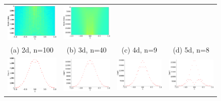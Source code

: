 \documentclass[senior,final,11pt]{iscs-thesis}
\begin{document}
\begin{figure}[htbp]
\begin{tabular}{cccc}
    \includegraphics[width=45mm]{figure/grid_graph_dim[9,9,9,9]txt_pdos.png} &
    \includegraphics[width=45mm]{figure/grid_graph_dim[8,8,8,8,8]txt_pdos.png} \\
    (a) 2d, n=100 & (b) 3d, n=40& (c) 4d, n=9 & (d) 5d, n=8\\ [6pt]
    \includegraphics[width=45mm]{figure/grid_graph_dim[7,7,7,7,7,7]txt_dos.png} &
    \includegraphics[width=45mm]{figure/grid_graph_dim[6,6,6,6,6,6,6]txt_dos.png} &
    \includegraphics[width=45mm]{figure/grid_graph_dim[5,5,5,5,5,5,5,5]txt_dos.png} &
    \includegraphics[width=45mm]{figure/grid_graph_dim[4,4,4,4,4,4,4,4,4]txt_dos.png} \\

\end{tabular}
\end{figure}
\end{document}
